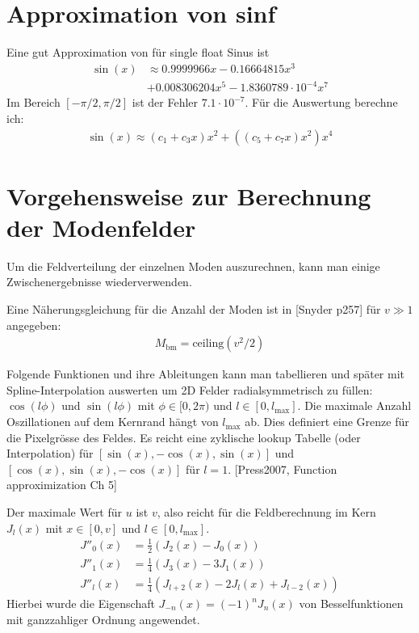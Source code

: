 \documentclass{article}
\def\({\left(}
\def\){\right)}
\newcommand{\lmax}{l_\textrm{max}}
\begin{document}
\section{Approximation von sinf}
Eine gut Approximation von f\"ur single float Sinus ist
\begin{align}
  \sin(x)&\approx 0.9999966 x -0.16664815 x^3 \nonumber\\
  &+0.008306204 x^5 -1.8360789\cdot 10^{-4} x^7 
\end{align}
Im Bereich $[-\pi/2,\pi/2]$ ist der Fehler $7.1\cdot 10^{-7}$.
F\"ur die Auswertung berechne ich:
\begin{align}
  \sin(x) \approx (c_1 + c_3 x) x^2 + ( (c_5 +c_7 x)x^2) x^4
\end{align}


\section{Vorgehensweise zur Berechnung der Modenfelder}
Um die Feldverteilung der einzelnen Moden auszurechnen, kann man
einige Zwischenergebnisse wiederverwenden.

Eine N\"aherungsgleichung f\"ur die Anzahl der Moden ist in [Snyder
p257] f\"ur $v\gg 1$ angegeben:
\begin{align}
  M_\textrm{bm} = \textrm{ceiling}\(v^2/2\)
\end{align}

Folgende Funktionen und ihre Ableitungen kann man tabellieren und
sp\"ater mit Spline-Interpolation auswerten um 2D Felder
radialsymmetrisch zu f\"ullen: $\cos(l\phi)$ und $\sin(l\phi)$ mit
$\phi\in[0,2\pi)$ und $l\in[0,\lmax]$. Die maximale Anzahl
Oszillationen auf dem Kernrand h\"angt von $\lmax$ ab. Dies definiert
eine Grenze f\"ur die Pixelgr\"osse des Feldes. Es reicht eine
zyklische lookup Tabelle (oder Interpolation) f\"ur
$[\sin(x),-\cos(x),\sin(x)]$ und $[\cos(x),\sin(x),-\cos(x)]$ f\"ur $l=1$.
[Press2007, Function approximization Ch 5]


Der maximale Wert f\"ur $u$ ist $v$, also reicht f\"ur die
Feldberechnung im Kern $J_l(x)$ mit
$x\in[0,v]$ und $l\in[0,\lmax]$. 
\begin{align}
  J''_0(x) &= \frac{1}{2}\(J_2(x)-J_0(x)\)\\
  J''_1(x) &= \frac{1}{4}\(J_3(x)-3J_1(x)\)\\
  J''_l(x) &= \frac{1}{4}\(J_{l+2}(x)-2J_l(x)+J_{l-2}(x)\)
\end{align}
Hierbei wurde die Eigenschaft $J_{-n}(x) = (-1)^n J_n(x)$ von
Besselfunktionen mit ganzzahliger Ordnung angewendet.
\end{document}
